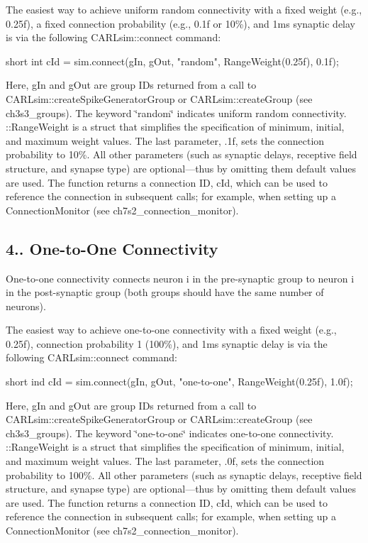 The easiest way to achieve uniform random connectivity with a fixed weight (e.\+g., 0.\+25f), a fixed connection probability (e.\+g., 0.\+1f or 10\%), and 1ms synaptic delay is via the following C\+A\+R\+Lsim\+::connect command\+: 
\begin{DoxyCode}
\textcolor{keywordtype}{short} \textcolor{keywordtype}{int} cId = sim.connect(gIn, gOut, \textcolor{stringliteral}{"random"}, RangeWeight(0.25f), 0.1f);
\end{DoxyCode}
 Here, {\ttfamily g\+In} and {\ttfamily g\+Out} are group I\+Ds returned from a call to C\+A\+R\+Lsim\+::create\+Spike\+Generator\+Group or C\+A\+R\+Lsim\+::create\+Group (see ch3s3\+\_\+groups). The keyword \char`\"{}random\char`\"{} indicates uniform random connectivity. \+::\+Range\+Weight is a struct that simplifies the specification of minimum, initial, and maximum weight values. The last parameter, {.\+1f}, sets the connection probability to 10\%. All other parameters (such as synaptic delays, receptive field structure, and synapse type) are optional---thus by omitting them default values are used. The function returns a connection ID, {\ttfamily c\+Id}, which can be used to reference the connection in subsequent calls; for example, when setting up a Connection\+Monitor (see ch7s2\+\_\+connection\+\_\+monitor).\hypertarget{ch4_connections_ch4s1s7_1to1}{}\subsection{4.. One-\/to-\/\+One Connectivity}\label{ch4_connections_ch4s1s7_1to1}
One-\/to-\/one connectivity connects neuron i in the pre-\/synaptic group to neuron i in the post-\/synaptic group (both groups should have the same number of neurons).

The easiest way to achieve one-\/to-\/one connectivity with a fixed weight (e.\+g., 0.\+25f), connection probability 1 (100\%), and 1ms synaptic delay is via the following C\+A\+R\+Lsim\+::connect command\+: 
\begin{DoxyCode}
\textcolor{keywordtype}{short} ind cId = sim.connect(gIn, gOut, \textcolor{stringliteral}{"one-to-one"}, RangeWeight(0.25f), 1.0f);
\end{DoxyCode}
 Here, {\ttfamily g\+In} and {\ttfamily g\+Out} are group I\+Ds returned from a call to C\+A\+R\+Lsim\+::create\+Spike\+Generator\+Group or C\+A\+R\+Lsim\+::create\+Group (see ch3s3\+\_\+groups). The keyword \char`\"{}one-\/to-\/one\char`\"{} indicates one-\/to-\/one connectivity. \+::\+Range\+Weight is a struct that simplifies the specification of minimum, initial, and maximum weight values. The last parameter, {.\+0f}, sets the connection probability to 100\%. All other parameters (such as synaptic delays, receptive field structure, and synapse type) are optional---thus by omitting them default values are used. The function returns a connection ID, {\ttfamily c\+Id}, which can be used to reference the connection in subsequent calls; for example, when setting up a Connection\+Monitor (see ch7s2\+\_\+connection\+\_\+monitor).

